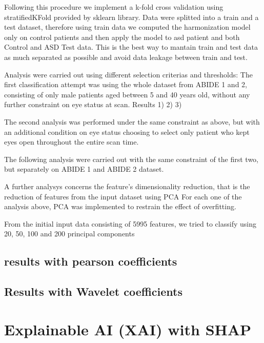 \documentclass[a4paper,11pt]{article}
\begin{document}
Following this procedure we implement a k-fold cross validation using stratifiedKFold provided by sklearn library. Data were splitted into a train and a test dataset, therefore using train data we computed the harmonization model only on control patients and then apply the model to asd patient and both Control and ASD Test data.
This is the best way to mantain train and test data as much separated as possible and avoid data leakage between train and test.

Analysis were carried out using different selection criterias and thresholds:
The first classification attempt was using the whole dataset from ABIDE 1 and 2, consisting of only male patients aged between 5 and 40 years old, without any further constraint on eye status at scan.
Results 1) 2) 3)

The second analysis was performed under the same constraint as above, but with an additional condition on eye status choosing to select only patient who kept eyes open throughout the entire scan time.

The following analysis were carried out with the same constraint of the first two, but separately on ABIDE 1 and ABIDE 2 dataset.

A further analysys concerns the feature's dimensionality reduction, that is the reduction of features from the input dataset using PCA
For each one of the analysis above, PCA was implemented to restrain the effect of overfitting.

From the initial input data consisting of 5995 features, we tried to classify using 20, 50, 100 and 200 principal components

\subsection{results with pearson coefficients}

\subsection{Results with Wavelet coefficients}








\section{Explainable AI (XAI) with SHAP}
\end{document}
